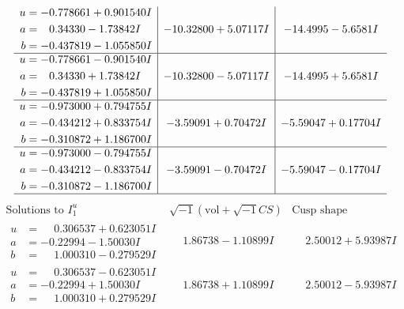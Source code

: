 \documentclass[1p]{elsarticle_modified}
\theoremstyle{definition}
\newcommand{\I}{\sqrt{-1}}
\begin{document}
$$\begin{array}{c|c|c}
\begin{aligned}
u &= -0.778661 + 0.901540 I \\
a &= \phantom{-}0.34330 - 1.73842 I \\
b &= -0.437819 - 1.055850 I\end{aligned}
 & -10.32800 + 5.07117 I & -14.4995 - 5.6581 I \\ \hline\begin{aligned}
u &= -0.778661 - 0.901540 I \\
a &= \phantom{-}0.34330 + 1.73842 I \\
b &= -0.437819 + 1.055850 I\end{aligned}
 & -10.32800 - 5.07117 I & -14.4995 + 5.6581 I \\ \hline\begin{aligned}
u &= -0.973000 + 0.794755 I \\
a &= -0.434212 + 0.833754 I \\
b &= -0.310872 + 1.186700 I\end{aligned}
 & -3.59091 + 0.70472 I & -5.59047 + 0.17704 I \\ \hline\begin{aligned}
u &= -0.973000 - 0.794755 I \\
a &= -0.434212 - 0.833754 I \\
b &= -0.310872 - 1.186700 I\end{aligned}
 & -3.59091 - 0.70472 I & -5.59047 - 0.17704 I\\
 \hline 
 \end{array}$$\newpage$$\begin{array}{c|c|c}  
\text{Solutions to }I^u_{1}& \I (\text{vol} + \sqrt{-1}CS) & \text{Cusp shape}\\
 \hline 
\begin{aligned}
u &= \phantom{-}0.306537 + 0.623051 I \\
a &= -0.22994 - 1.50030 I \\
b &= \phantom{-}1.000310 - 0.279529 I\end{aligned}
 & \phantom{-}1.86738 - 1.10899 I & \phantom{-}2.50012 + 5.93987 I \\ \hline\begin{aligned}
u &= \phantom{-}0.306537 - 0.623051 I \\
a &= -0.22994 + 1.50030 I \\
b &= \phantom{-}1.000310 + 0.279529 I\end{aligned}
 & \phantom{-}1.86738 + 1.10899 I & \phantom{-}2.50012 - 5.93987 I \\ \hline\begin{aligned}

\end{aligned}
\end{array}$$
\end{document}
